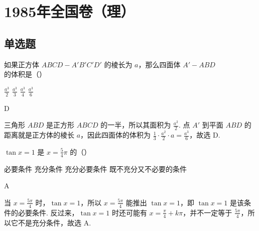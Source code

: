 \chapter{1985年全国卷（理）}

\section{单选题}

\begin{problem}

如果正方体 \(ABCD - A'B'C'D'\) 的棱长为 \(a\)，那么四面体 \(A' - ABD\) 的体积是（\quad）

\choices
    {\(\frac{a^{3}}{2}\)}
    {\(\frac{a^3}{3}\)}
    {\(\frac{a^3}{4}\)}
    {\(\frac{a^3}{6}\)}

\begin{answer}
D
\end{answer}

\begin{solution}
三角形 \(ABD\) 是正方形 \(ABCD\) 的一半，所以其面积为 \(\frac{a^2}{2}\). 点 \(A'\) 到平面 \(ABD\) 的距离就是正方体的棱长 \(a\)，因此四面体的体积为 \(\frac{1}{3}\cdot\frac{a^2}{2}\cdot a=\frac{a^3}{6}\)，故选 D.
\end{solution}
\end{problem}

\begin{problem}

\(\tan x = 1\) 是 \(x = \frac{5}{4}\pi\) 的（\quad）

\choices
    {必要条件}
    {充分条件}
    {充分必要条件}
    {既不充分又不必要的条件}

\begin{answer}
A
\end{answer}

\begin{solution}
当 \(x=\frac{5\pi}{4}\) 时，\(\tan x=1\)，所以 \(x=\frac{5\pi}{4}\) 能推出 \(\tan x=1\)，即 \(\tan x=1\) 是该条件的必要条件. 反过来，\(\tan x=1\) 时还可能有 \(x=\frac{\pi}{4}+k\pi\)，并不一定等于 \(\frac{5\pi}{4}\)，所以它不是充分条件，故选 A.
\end{solution}
\end{problem}

